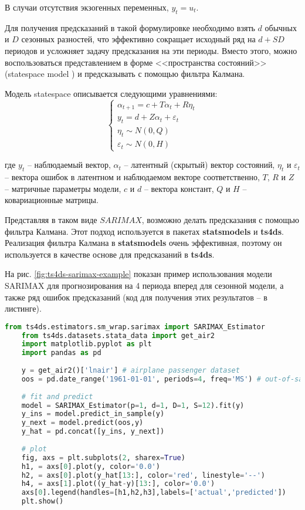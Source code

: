 \documentclass[a4paper,14pt]{extreport}
\begin{document}
	В случаи отсутствия экзогенных переменных, $y_t = u_t$.
	
	Для получения предсказаний в такой формулировке необходимо взять $d$ обычных и $D$ сезонных разностей, что эффективно сокращает исходный ряд на $d+SD$ периодов и усложняет задачу предсказания на эти периоды. Вместо этого, можно воспользоваться представлением в форме <<пространства состояний>> (statespace model \cite{fulton_statespace}) и предсказывать с помощью фильтра Калмана.
	
	Модель statespace описывается следующими уравнениями:
	\begin{equation}
	\begin{cases}
	\alpha_{t+1} = c + T \alpha_t + R \eta_t \\
	y_t = d + Z \alpha_t + \varepsilon_t \\
	\eta_{t} \sim N(0, Q) \\
	\varepsilon_t \sim N(0, H)
	\end{cases} 
	\label{eq:sarimax_statespace}
	\end{equation}
	
	где $y_t$ -- наблюдаемый вектор, $\alpha_t$ -- латентный (скрытый) вектор состояний, $\eta_t$ и $\varepsilon_t$ -- вектора ошибок в латентном и наблюдаемом векторе соответственно,
	$T$, $R$ и $Z$ -- матричные параметры модели, $c$ и $d$ -- вектора констант, $Q$ и $H$ -- ковариационные матрицы.
	
	Представляя в таком виде $SARIMAX$, возможно делать предсказания с помощью фильтра Калмана. Этот подход используется в пакетах \textbf{statsmodels} \cite{fulton_statespace} и \textbf{ts4ds}. Реализация фильтра Калмана в \textbf{statsmodels} очень эффективная, поэтому он используется в качестве основе для предсказаний в \textbf{ts4ds}. 
	
	На рис. \ref{fig:ts4ds-sarimax-example} показан пример использования модели SARIMAX для прогнозирования на 4 периода вперед для сезонной модели, а также ряд ошибок предсказаний (код для получения этих результатов -- в листинге).
	
	\begin{lstlisting}[language=Python]
	from ts4ds.estimators.sm_wrap.sarimax import SARIMAX_Estimator
	from ts4ds.datasets.stata_data import get_air2
	import matplotlib.pyplot as plt
	import pandas as pd
	
	y = get_air2()['lnair'] # airplane passenger dataset
	oos = pd.date_range('1961-01-01', periods=4, freq='MS') # out-of-sample
	
	# fit and predict
	model = SARIMAX_Estimator(p=1, d=1, D=1, S=12).fit(y)
	y_ins = model.predict_in_sample(y)
	y_next = model.predict(oos,y)
	y_hat = pd.concat([y_ins, y_next])
	
	# plot
	fig, axs = plt.subplots(2, sharex=True)
	h1, = axs[0].plot(y, color='0.0')
	h2, = axs[0].plot(y_hat[13:], color='red', linestyle='--')
	h4, = axs[1].plot((y_hat-y)[13:], color='0.0')
	axs[0].legend(handles=[h1,h2,h3],labels=['actual','predicted'])
	plt.show()
	\end{lstlisting}
	
\end{document}
